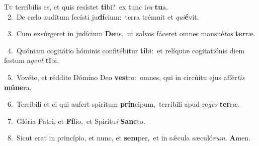 \lettrine{\initial\textcolor{\initialcolor}{T}}{u} terríbilis es, et quis resístet \textbf{ti}\-bi?~\star ex tunc i\textit{ra} \textbf{tu}\-a.\\
{\numbfont\textcolor{\numbcolor}{~2.}}~De cælo audítum fecísti ju\-\textbf{dí}\-cium:~\star terra trémuit et \textit{qui}\-\textbf{é}vit.\par
{\numbfont\textcolor{\numbcolor}{~3.}}~Cum exsúrgeret in judícium \textbf{De}\-us,~\star ut salvos fáceret omnes mansué\textit{tos} \textbf{ter}\-ræ.\par
{\numbfont\textcolor{\numbcolor}{~4.}}~Quóniam cogitátio hóminis confitébitur \textbf{ti}\-bi:~\star et relíquiæ cogitatiónis diem festum a\textit{gent} \textbf{ti}\-bi.\par
{\numbfont\textcolor{\numbcolor}{~5.}}~Vovéte, et réddite Dómino Deo \textbf{ves}\-tro:~\star omnes, qui in circúitu ejus affér\textit{tis} \textbf{mú}\-\textbf{ne}ra.\par
{\numbfont\textcolor{\numbcolor}{~6.}}~Terríbili et ei qui aufert spíritum \textbf{prín}\-cipum,~\star terríbili apud re\textit{ges} \textbf{ter}\-ræ.\par
{\numbfont\textcolor{\numbcolor}{~7.}}~Glória Patri, et \textbf{Fí}\-lio,~\star et Spirítu\textit{i} \textbf{Sanc}\-to.\par
{\numbfont\textcolor{\numbcolor}{~8.}}~Sicut erat in princípio, et nunc, et \textbf{sem}\-per,~\star et in sǽcula sæculó\-\textit{rum}\-. \textbf{A}\-men.\par
